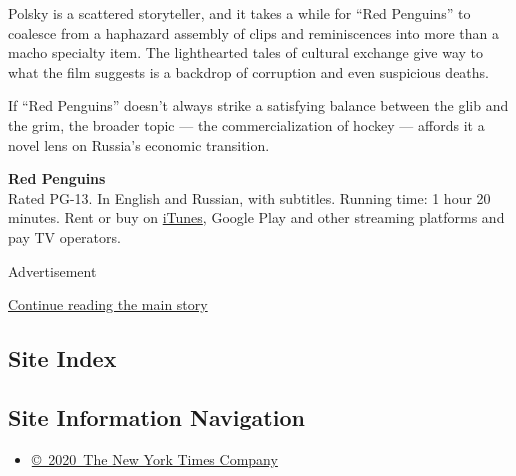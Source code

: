Polsky is a scattered storyteller, and it takes a while for ``Red
Penguins'' to coalesce from a haphazard assembly of clips and
reminiscences into more than a macho specialty item. The lighthearted
tales of cultural exchange give way to what the film suggests is a
backdrop of corruption and even suspicious deaths.

If ``Red Penguins'' doesn't always strike a satisfying balance between
the glib and the grim, the broader topic --- the commercialization of
hockey --- affords it a novel lens on Russia's economic transition.

\textbf{Red Penguins}\\
Rated PG-13. In English and Russian, with subtitles. Running time: 1
hour 20 minutes. Rent or buy on
\href{https://tv.apple.com/us/movie/red-penguins/umc.cmc.1a55rxdxlme2cwu9ylp4edln7}{iTunes},
Google Play and other streaming platforms and pay TV operators.

Advertisement

\protect\hyperlink{after-bottom}{Continue reading the main story}

\hypertarget{site-index}{%
\subsection{Site Index}\label{site-index}}

\hypertarget{site-information-navigation}{%
\subsection{Site Information
Navigation}\label{site-information-navigation}}

\begin{itemize}
\tightlist
\item
  \href{https://help.nytimes.com/hc/en-us/articles/115014792127-Copyright-notice}{©~2020~The
  New York Times Company}
\end{itemize}

